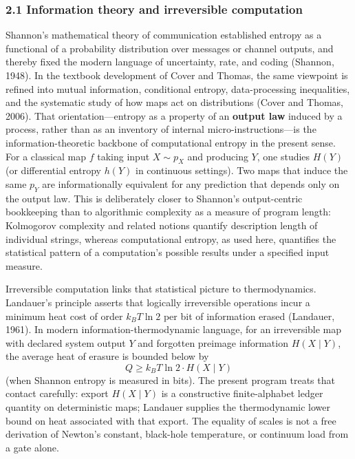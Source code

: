 \documentclass[
  11pt,
]{article}
\begin{document}
\subsubsection{2.1 Information theory and irreversible computation}\label{information-theory-and-irreversible-computation}

Shannon's mathematical theory of communication established entropy as a functional of a probability distribution over messages or channel outputs, and thereby fixed the modern language of uncertainty, rate, and coding (Shannon, 1948). In the textbook development of Cover and Thomas, the same viewpoint is refined into mutual information, conditional entropy, data-processing inequalities, and the systematic study of how maps act on distributions (Cover and Thomas, 2006). That orientation---entropy as a property of an \textbf{output law} induced by a process, rather than as an inventory of internal micro-instructions---is the information-theoretic backbone of computational entropy in the present sense. For a classical map \(f\) taking input \(X\sim p_X\) and producing \(Y\), one studies \(H(Y)\) (or differential entropy \(h(Y)\) in continuous settings). Two maps that induce the same \(p_Y\) are informationally equivalent for any prediction that depends only on the output law. This is deliberately closer to Shannon's output-centric bookkeeping than to algorithmic complexity as a measure of program length: Kolmogorov complexity and related notions quantify description length of individual strings, whereas computational entropy, as used here, quantifies the statistical pattern of a computation's possible results under a specified input measure.

Irreversible computation links that statistical picture to thermodynamics. Landauer's principle asserts that logically irreversible operations incur a minimum heat cost of order \(k_B T\ln 2\) per bit of information erased (Landauer, 1961). In modern information-thermodynamic language, for an irreversible map with declared system output \(Y\) and forgotten preimage information \(H(X\mid Y)\), the average heat of erasure is bounded below by \[
Q \ge k_B T\ln 2\cdot H(X\mid Y)
\] (when Shannon entropy is measured in bits). The present program treats that contact carefully: export \(H(X\mid Y)\) is a constructive finite-alphabet ledger quantity on deterministic maps; Landauer supplies the thermodynamic lower bound on heat associated with that export. The equality of scales is not a free derivation of Newton's constant, black-hole temperature, or continuum load from a gate alone.
\end{document}
